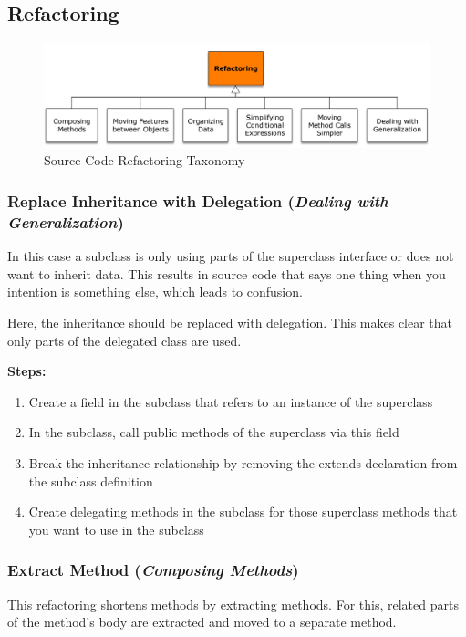 \subsection{Refactoring}

\begin{figure}[h]
	\centering
	\includegraphics[width=0.7\linewidth]{images/refactoring_taxonomy}
	\caption{Source Code Refactoring Taxonomy}
\end{figure}

\subsubsection*{Replace Inheritance with Delegation (\textit{Dealing with Generalization})}
In this case a subclass is only using parts of the superclass interface or does not want to inherit data.
This results in source code that says one thing when you intention is something else, which leads to confusion.

Here, the inheritance should be replaced with delegation.
This makes clear that only parts of the delegated class are used.\newline 

\textbf{Steps:}
\begin{enumerate}
	\item Create a field in the subclass that refers to an instance of the superclass
	\item In the subclass, call public methods of the superclass via this
	field
	\item Break the inheritance relationship by removing the extends declaration from the subclass definition
	\item Create delegating methods in the subclass for those
	superclass methods that you want to use in the subclass
\end{enumerate}

\subsubsection*{Extract Method (\textit{Composing Methods})}
This refactoring shortens methods by extracting methods.
For this, related parts of the method's body are extracted and moved to a separate method.

